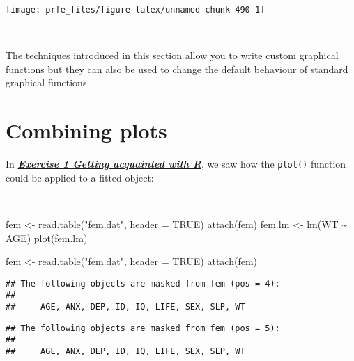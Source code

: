 \documentclass[
  12pt,
  a4paper]{book}
\newenvironment{Shaded}{\begin{snugshade}}{\end{snugshade}}
\newcommand{\AttributeTok}[1]{\textcolor[rgb]{0.77,0.63,0.00}{#1}}
\newcommand{\ConstantTok}[1]{\textcolor[rgb]{0.00,0.00,0.00}{#1}}
\newcommand{\FunctionTok}[1]{\textcolor[rgb]{0.00,0.00,0.00}{#1}}
\newcommand{\NormalTok}[1]{#1}
\newcommand{\OtherTok}[1]{\textcolor[rgb]{0.56,0.35,0.01}{#1}}
\newcommand{\SpecialCharTok}[1]{\textcolor[rgb]{0.00,0.00,0.00}{#1}}
\newcommand{\StringTok}[1]{\textcolor[rgb]{0.31,0.60,0.02}{#1}}
\begin{document}
\begin{center}\texttt{[image: prfe\_files/figure-latex/unnamed-chunk-490-1]} \end{center}

~

The techniques introduced in this section allow you to write custom graphical functions but they can also be used to change the default behaviour of standard graphical functions.

\hypertarget{combining-plots}{%
\section{Combining plots}\label{combining-plots}}

In \protect\hyperlink{exercise1}{\textbf{\emph{Exercise 1 Getting acquainted with R}}}, we saw how the \texttt{plot()} function could be applied to a fitted object:

~

\begin{Shaded}
\begin{Highlighting}[]
\NormalTok{fem }\OtherTok{\textless{}{-}} \FunctionTok{read.table}\NormalTok{(}\StringTok{"fem.dat"}\NormalTok{, }\AttributeTok{header =} \ConstantTok{TRUE}\NormalTok{)}
\FunctionTok{attach}\NormalTok{(fem)}
\NormalTok{fem.lm }\OtherTok{\textless{}{-}} \FunctionTok{lm}\NormalTok{(WT }\SpecialCharTok{\textasciitilde{}}\NormalTok{ AGE)}
\FunctionTok{plot}\NormalTok{(fem.lm)}
\end{Highlighting}
\end{Shaded}

\begin{Shaded}
\begin{Highlighting}[]
\NormalTok{fem }\OtherTok{\textless{}{-}} \FunctionTok{read.table}\NormalTok{(}\StringTok{"fem.dat"}\NormalTok{, }\AttributeTok{header =} \ConstantTok{TRUE}\NormalTok{)}
\FunctionTok{attach}\NormalTok{(fem)}
\end{Highlighting}
\end{Shaded}

\begin{verbatim}
## The following objects are masked from fem (pos = 4):
## 
##     AGE, ANX, DEP, ID, IQ, LIFE, SEX, SLP, WT
\end{verbatim}

\begin{verbatim}
## The following objects are masked from fem (pos = 5):
## 
##     AGE, ANX, DEP, ID, IQ, LIFE, SEX, SLP, WT
\end{verbatim}
\end{document}
